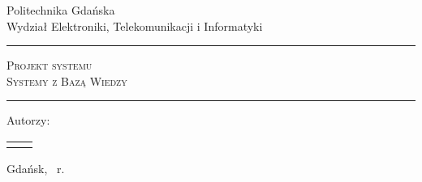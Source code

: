 \makeatletter

\renewcommand{\maketitle}{
	\begin{titlepage}
		\begin{center}
			\small Politechnika Gdańska \\ Wydział Elektroniki, Telekomunikacji i Informatyki
		\end{center}
		\vspace{3cm}
		\noindent \rule{\linewidth}{0.4mm}
		\begin{center}
			\textsc{
				\huge{Projekt systemu } \\
				\vspace{0.3ex}
				\LARGE{Systemy z Bazą Wiedzy}
			}
			\\
			\vspace{1em}
			\Large{\@title}
		\end{center}
		\rule{\linewidth}{0.4mm}
		\vspace{1em}
		\begin{center}
			\large Autorzy: \@author
		\end{center}
		\vspace{7em}
		\ifpdf
			\begin{tabularx}{\textwidth}{ X X }
				\makebox[0.5\textwidth][l]{
					\hspace{1cm}
					\texttt{[image: logo\_pg]}
				}
				&
				\makebox[0.5\textwidth][r]{
					\texttt{[image: logo\_eti]}
					\hspace{1cm}
				}
			\end{tabularx}
		\fi
		\vspace*{\stretch{6}}
		\begin{center}
			Gdańsk, \@date \ r.
		\end{center}
	\end{titlepage}
}

\makeatother

\maketitle{}
